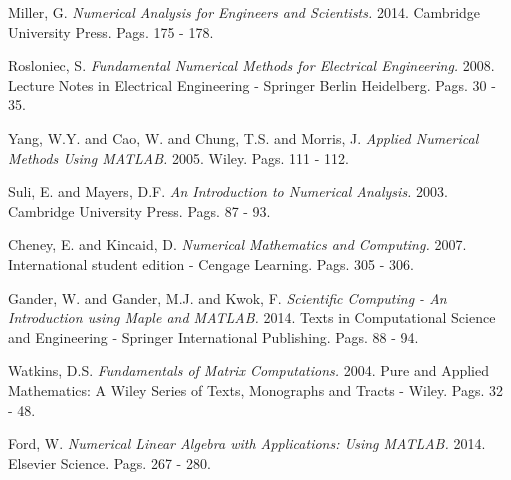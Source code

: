 \documentclass[11pt, spanish]{article}
\begin{document}
\begingroup
\renewcommand{\section}[2]{}%
\begin{thebibliography}{}


 Miller, G. {\em Numerical Analysis for Engineers and Scientists.} 2014. Cambridge University Press. Pags. 175 - 178.

 Rosloniec, S. {\em Fundamental Numerical Methods for Electrical Engineering.} 2008. Lecture Notes in Electrical Engineering - Springer Berlin Heidelberg. Pags. 30 - 35.


 Yang, W.Y. and Cao, W. and Chung, T.S. and Morris, J. {\em Applied Numerical Methods Using MATLAB.} 2005. Wiley. Pags. 111 - 112.

 Suli, E. and Mayers, D.F. {\em An Introduction to Numerical Analysis.} 2003. Cambridge University Press. Pags. 87 - 93.

 Cheney, E. and Kincaid, D. {\em Numerical Mathematics and Computing.} 2007. International student edition - Cengage Learning. Pags. 305 - 306.

 Gander, W. and Gander, M.J. and Kwok, F. {\em Scientific Computing - An Introduction using Maple and MATLAB.} 2014. Texts in Computational Science and Engineering - Springer International Publishing. Pags. 88 - 94.

 Watkins, D.S. {\em Fundamentals of Matrix Computations.} 2004. Pure and Applied Mathematics: A Wiley Series of Texts, Monographs and Tracts - Wiley. Pags. 32 - 48.

 Ford, W. {\em Numerical Linear Algebra with Applications: Using MATLAB.} 2014. Elsevier Science. Pags. 267 - 280.

\end{thebibliography}
\endgroup


\end{document}
